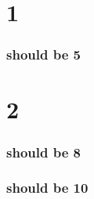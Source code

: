 \documentclass{beamer}
\begin{document}
\begin{frame}
\tableofcontents[part=1]
\tableofcontents[part=2]
\end{frame}

\part{1}

\makeatletter
{}\relax
\makeatother
\section{should be 5}
\begin{frame}
\end{frame}

\part{2}

\makeatletter
{}\relax
\makeatother
\section{should be 8}
\begin{frame}
\end{frame}

\makeatletter
{}\relax
\makeatother
\section{should be 10}
\begin{frame}
\end{frame}
\end{document}
